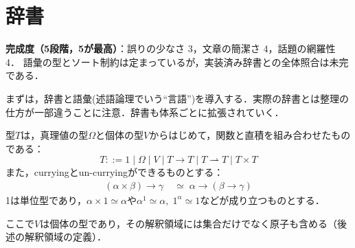 \documentclass[../../main-detail.tex]{subfiles}
\begin{document}
\section{辞書}
\begin{leftwavybox}
\textbf{完成度（5段階，5が最高）}：誤りの少なさ 3，文章の簡潔さ 4，話題の網羅性 4．
語彙の型とソート制約は定まっているが，実装済み辞書との全体照合は未完である．
\end{leftwavybox}
まずは，辞書と語彙(述語論理でいう``言語'')を導入する．実際の辞書とは整理の仕方が一部違うことに注意．辞書も体系ごとに拡張されていく．

\begin{definition}[型]
    型$T$は，真理値の型$\Omega$と個体の型$V$からはじめて，関数と直積を組み合わせたものである：
    $$
        T ::= 1 \mid \Omega \mid V \mid T \to T \mid T \rightharpoonup T \mid T \times T
    $$
    また，curryingとun-curryingができるものとする：
    \begin{align*}
        (\alpha \times \beta) \to \gamma \;&\simeq\; \alpha \to (\beta \to \gamma)
    \end{align*}
    1は単位型であり，$\alpha \times 1 \simeq \alpha$や$\alpha^1 \simeq \alpha,\; 1^\alpha \simeq 1$などが成り立つものとする．
\end{definition}
\begin{remark}
    ここで$V$は個体の型であり，その解釈領域には集合だけでなく原子も含める（後述の解釈領域の定義）．
\end{remark}
\end{document}
